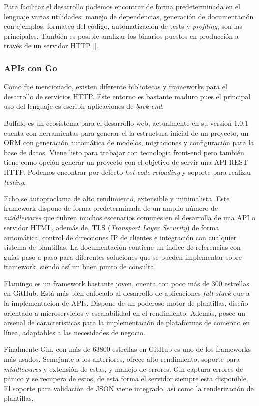 Para facilitar el desarrollo podemos encontrar de forma predeterminada en el lenguaje varias utilidades: manejo de dependencias, generación de documentación con ejemplos, formateo del código, automatización de tests y \textit{profiling}, son las principales. También es posible analizar los binarios puestos en producción a través de un servidor HTTP [\cite{go-pros-cons}].

\subsubsection{APIs con Go}

Como fue mencionado, existen diferente bibliotecas y frameworks para el desarrollo de servicios HTTP. Este entorno es bastante maduro pues el principal uso del lenguaje es escribir aplicaciones de \textit{back-end}.

Buffalo es un ecosistema para el desarrollo web, actualmente en su version 1.0.1 cuenta con herramientas para generar el la estructura inicial de un proyecto, un ORM con generación automática de modelos, migraciones y configuración para la base de datos. Viene listo para trabajar con tecnología front-end pero también tiene como opción generar un proyecto con el objetivo de servir una API REST HTTP. Podemos encontrar por defecto \textit{hot code reloading} y soporte para realizar \textit{testing}.
              
Echo se autoproclama de alto rendimiento, extensible y minimalista. Este framework dispone de forma predeterminada de un amplio número de \textit{middlewares} que cubren muchos escenarios comunes en el desarrolla de una API o servidor HTML, además de, TLS (\textit{Transport Layer Security}) de forma automática, control de direcciones IP de clientes e integración con cualquier sistema de plantillas. La documentación contiene un índice de referencias con guías paso a paso para diferentes soluciones que se pueden implementar sobre framework, siendo así un buen punto de consulta.

Flamingo es un framework bastante joven, cuenta con poco más de 300 estrellas en GitHub. Está más bien enfocado al desarrollo de aplicaciones \textit{full-stack} que a la implementacion de APIs. Dispone de un poderoso motor de plantillas, diseño orientado a microservicios y escalabilidad en el rendimiento. Además, posee un arsenal de características para la implementación de plataformas de comercio en línea, adaptables a las necesidades de negocio.

Finalmente Gin, con más de 63800 estrellas en GitHub es uno de los frameworks más usados. Semejante a los anteriores, ofrece alto rendimiento, soporte para \textit{middlewares} y extensión de estas, y manejo de errores. Gin captura errores  de pánico y se recupera de estos, de esta forma el servidor siempre esta disponible. El soporte para validación de JSON viene integrado, así como la renderización de plantillas.

